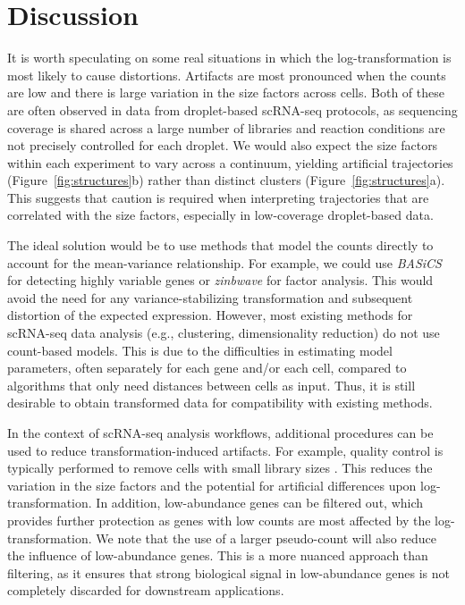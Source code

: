 \documentclass[10pt,letterpaper]{article}
\begin{document}
\section{Discussion}
It is worth speculating on some real situations in which the log-transformation is most likely to cause distortions.
Artifacts are most pronounced when the counts are low and there is large variation in the size factors across cells.
Both of these are often observed in data from droplet-based scRNA-seq protocols, as sequencing coverage is shared across a large number of libraries and reaction conditions are not precisely controlled for each droplet.
We would also expect the size factors within each experiment to vary across a continuum, yielding artificial trajectories (Figure~\ref{fig:structures}b) rather than distinct clusters (Figure~\ref{fig:structures}a).
This suggests that caution is required when interpreting trajectories that are correlated with the size factors, especially in low-coverage droplet-based data.

The ideal solution would be to use methods that model the counts directly to account for the mean-variance relationship.
For example, we could use \textit{BASiCS} \cite{vallejos2016beyond} for detecting highly variable genes or \textit{zinbwave} \cite{risso2018general} for factor analysis.
This would avoid the need for any variance-stabilizing transformation and subsequent distortion of the expected expression.
However, most existing methods for scRNA-seq data analysis (e.g., clustering, dimensionality reduction) do not use count-based models.
This is due to the difficulties in estimating model parameters, often separately for each gene and/or each cell,
compared to algorithms that only need distances between cells as input.
Thus, it is still desirable to obtain transformed data for compatibility with existing methods.

In the context of scRNA-seq analysis workflows, additional procedures can be used to reduce transformation-induced artifacts.
For example, quality control is typically performed to remove cells with small library sizes \cite{ilicic2016classification,lun2016stepbystep}.
This reduces the variation in the size factors and the potential for artificial differences upon log-transformation.
In addition, low-abundance genes can be filtered out, which provides further protection as genes with low counts are most affected by the log-transformation.
We note that the use of a larger pseudo-count will also reduce the influence of low-abundance genes.
This is a more nuanced approach than filtering, as it ensures that strong biological signal in low-abundance genes is not completely discarded for downstream applications.
\end{document}
